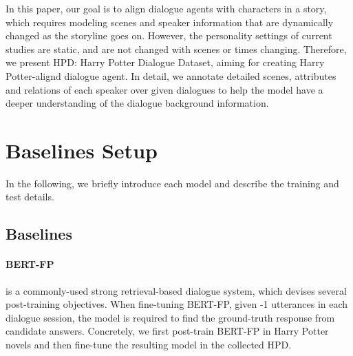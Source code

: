 \documentclass[11pt]{article}
\begin{document}
In this paper, our goal is to align dialogue agents with characters in a story,  which requires modeling scenes and speaker information that are dynamically changed as the storyline goes on.
However, the personality settings of current studies are static, and are not changed with scenes or times changing. Therefore, we present HPD: Harry Potter Dialogue Dataset, aiming for creating Harry Potter-alignd dialogue agent. In detail, we annotate detailed scenes,  attributes and relations of each speaker over given dialogues to help the model have a deeper understanding of the dialogue background information.  





















\section{Baselines Setup}
\label{baselines}
In the following, we briefly introduce each model and describe the training and test details.
\subsection{Baselines}








\paragraph{BERT-FP} is a commonly-used strong retrieval-based dialogue system, which devises several post-training objectives. When fine-tuning BERT-FP, given -1 utterances in each dialogue session, the model is required to find the ground-truth response from  candidate answers. Concretely, we first post-train BERT-FP in Harry Potter novels and then fine-tune the resulting model in the collected HPD.
\end{document}
